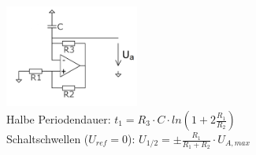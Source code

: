 \documentclass[A4]{scrreprt}
\begin{document}
  \includegraphics[width=0.33\textwidth]{Vereinfachter_Dreieckgenerator.png}\\
  Halbe Periodendauer: $t_1 = R_3 \cdot C \cdot ln(1+2\frac{R_1}{R_2})$\\
  Schaltschwellen ($U_{ref} = 0$): $U_{1/2} = \pm \frac{R_1}{R_1+R_2} \cdot U_{A, max}$\\
  
\end{document}
